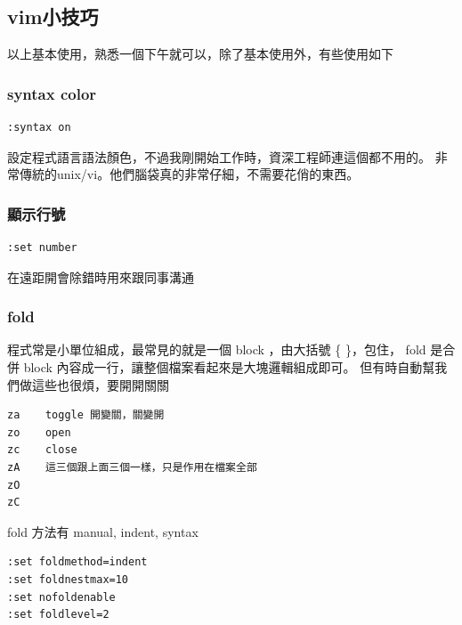     \subsection{vim小技巧}
      以上基本使用，熟悉一個下午就可以，除了基本使用外，有些使用如下
      \subsubsection{syntax color}
      \begin{verbatim}
:syntax on
      \end{verbatim}
      設定程式語言語法顏色，不過我剛開始工作時，資深工程師連這個都不用的。
      非常傳統的unix/vi。他們腦袋真的非常仔細，不需要花俏的東西。

      \subsubsection{顯示行號}
      \begin{verbatim}
:set number
      \end{verbatim}
      在遠距開會除錯時用來跟同事溝通

      \subsubsection{fold}
      程式常是小單位組成，最常見的就是一個 block ，由大括號 \{ \}，包住，
      fold 是合併 block 內容成一行，讓整個檔案看起來是大塊邏輯組成即可。
      但有時自動幫我們做這些也很煩，要開開關關
      \begin{verbatim}
za    toggle 開變關，關變開
zo    open
zc    close
zA    這三個跟上面三個一樣，只是作用在檔案全部
zO
zC
      \end{verbatim}
      fold 方法有 manual, indent, syntax
      \begin{verbatim}
:set foldmethod=indent
:set foldnestmax=10
:set nofoldenable
:set foldlevel=2
      \end{verbatim}
